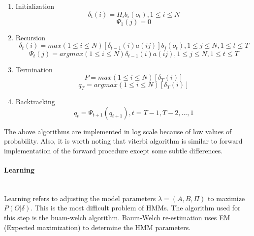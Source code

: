 \begin{enumerate}
	\item Initialization
	\begin{equation} \delta_{t}(i) = \Pi_{i}b_{i}(o_{t}) , 1 \leq i \leq N \end{equation}
	\begin{equation} \Psi_{1}(j) = 0 \end{equation}
	
	\item Recursion
	\begin{equation} \delta_{t}(i) = max(1 \leq i \leq N)[\delta_{t-1}(i)a(ij)]b_{j}(o_{t}), 1 \leq j \leq N , 1 \leq t \leq T \end{equation}
	\begin{equation} \Psi_{t}(j) = argmax(1 \leq i \leq N)\delta_{t-1}(i)a(ij), 1 \leq j \leq N , 1 \leq t \leq T \end{equation}
	
	\item Termination
	\begin{equation} P = max(1 \leq i \leq N) [\delta_{T}(i)] \end{equation}
	\begin{equation} q_{T} = argmax(1 \leq i \leq N) [\delta_{T}(i)] \end{equation}
	
	\item Backtracking
	\begin{equation} q_{t} = \Psi_{t+1}(q_{t+1}), t = T-1, T-2,...,1 \end{equation}
\end{enumerate}
The above algorithms are implemented in log scale because of low values of probability.
Also, it is worth noting that viterbi algorithm is similar to forward implementation of the
forward procedure except some subtle differences.

\paragraph{Learning} \mbox{}\\

Learning refers to adjusting the model parameters $ \lambda = (A,B, \Pi ) $ to maximize $ P(O|\delta)$. This is the most difficult problem of HMMs. The algorithm used for this step is the buam-welch algorithm. Baum-Welch re-estimation uses EM (Expected maximization) to determine the HMM parameters.

